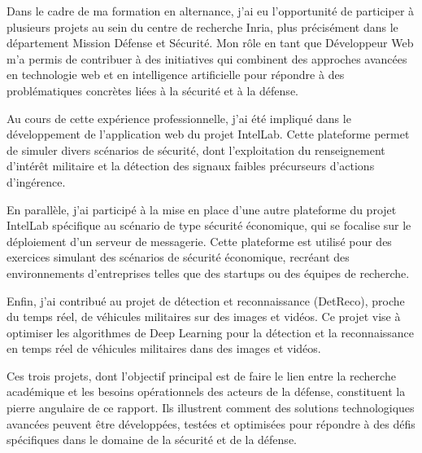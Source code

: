 %
%
\sloppy

Dans le cadre de ma formation en alternance, j'ai eu l'opportunité de participer à plusieurs projets au sein du centre de recherche Inria, plus précisément dans le département Mission Défense et Sécurité. Mon rôle en tant que Développeur Web m'a permis de contribuer à des initiatives qui combinent des approches avancées en technologie web et en intelligence artificielle pour répondre à des problématiques concrètes liées à la sécurité et à la défense.

Au cours de cette expérience professionnelle, j'ai été impliqué dans le développement de l'application web du projet IntelLab. Cette plateforme permet de simuler divers scénarios de sécurité, dont l'exploitation du renseignement d'intérêt militaire et la détection des signaux faibles précurseurs d'actions d'ingérence.

En parallèle, j'ai participé à la mise en place d'une autre plateforme du projet IntelLab spécifique au scénario de type sécurité économique, qui se focalise sur le déploiement d'un serveur de messagerie. Cette plateforme est utilisé pour des exercices simulant des scénarios de sécurité économique, recréant des environnements d'entreprises telles que des startups ou des équipes de recherche.

Enfin, j'ai contribué au projet de détection et reconnaissance (DetReco), proche du temps réel, de véhicules militaires sur des images et vidéos. Ce projet vise à optimiser les algorithmes de Deep Learning pour la détection et la reconnaissance en temps réel de véhicules militaires dans des images et vidéos.

Ces trois projets, dont l'objectif principal est de faire le lien entre la recherche académique et les besoins opérationnels des acteurs de la défense, constituent la pierre angulaire de ce rapport. Ils illustrent comment des solutions technologiques avancées peuvent être développées, testées et optimisées pour répondre à des défis spécifiques dans le domaine de la sécurité et de la défense.

